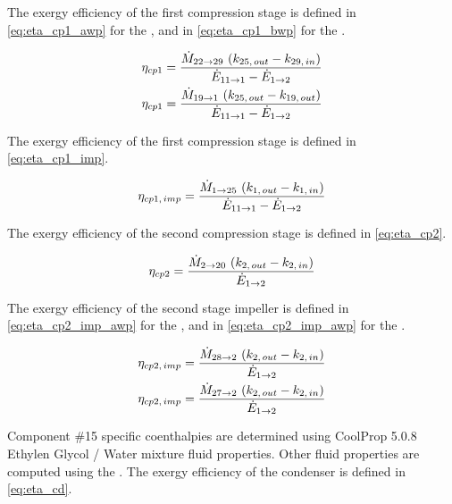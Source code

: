 The exergy efficiency of the first compression stage is defined in \cref{eq:eta_cp1_awp} for the \AWP{}, and in \cref{eq:eta_cp1_bwp} for the \BWP{}.

\begin{subequations}
  \begin{align}
  \eta_{cp1} = \dfrac{\dotM{22}{29} \, \left( k_{25,\,out} - k_{29,\,in} \right)}{\dotE{11}{1} - \dotE{1}{2}}
  \tagaddtextthree{$\left[-\right]$} \label{eq:eta_cp1_awp} \\
  \eta_{cp1} = \dfrac{\dotM{19}{1} \, \left( k_{25,\,out} - k_{19,\,out} \right)}{\dotE{11}{1} - \dotE{1}{2}}
  \tagaddtextthree{$\left[-\right]$} \label{eq:eta_cp1_bwp}
  \end{align}
\end{subequations}

The exergy efficiency of the first compression stage is defined in
\cref{eq:eta_cp1_imp}.

\begin{equation}
  \label{eq:eta_cp1_imp}
  \eta_{cp1,\,imp} = \dfrac{\dotM{1}{25} \, \left( k_{1,\,out} - k_{1,\,in} \right)}{\dotE{11}{1} - \dotE{1}{2}}
  \tagaddtexttwo{$\left[-\right]$}
\end{equation}

The exergy efficiency of the second compression stage is defined in
\cref{eq:eta_cp2}.

\begin{equation}
  \label{eq:eta_cp2}
  \eta_{cp2} = \dfrac{\dotM{2}{20} \, \left( k_{2,\,out} - k_{2,\,in} \right)}{\dotE{1}{2}}
  \tagaddtexttwo{$\left[-\right]$}
\end{equation}

The exergy efficiency of the second stage impeller is defined in
\cref{eq:eta_cp2_imp_awp} for the \AWP{}, and in
\cref{eq:eta_cp2_imp_awp} for the \BWP{}.

\begin{subequations}
  \begin{align}
    \eta_{cp2,\,imp} = \dfrac{\dotM{28}{2} \, \left( k_{2,\,out} - k_{2,\,in} \right)}{\dotE{1}{2}}
    \tagaddtextthree{$\left[-\right]$} \label{eq:eta_cp2_imp_awp} \\
    \eta_{cp2,\,imp} = \dfrac{\dotM{27}{2} \, \left( k_{2,\,out} - k_{2,\,in} \right)}{\dotE{1}{2}}
    \tagaddtextthree{$\left[-\right]$} \label{eq:eta_cp2_imp_bwp}
  \end{align}
\end{subequations}

Component \#15 specific coenthalpies are determined using CoolProp
5.0.8 \citep{coolprop} Ethylen Glycol / Water mixture fluid
properties. Other fluid properties are computed using the \REFPROP{}
\citep{REFPROP90}. The exergy efficiency of the condenser is defined in \cref{eq:eta_cd}.

